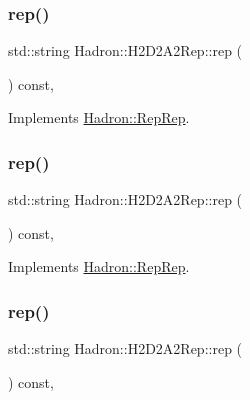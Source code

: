 \subsubsection{\texorpdfstring{rep()}{rep()}\hspace{0.1cm}{\footnotesize\ttfamily [2/5]}}
{\footnotesize\ttfamily std\+::string Hadron\+::\+H2\+D2\+A2\+Rep\+::rep (\begin{DoxyParamCaption}{ }\end{DoxyParamCaption}) const\hspace{0.3cm}{\ttfamily [inline]}, {\ttfamily [virtual]}}



Implements \mbox{\hyperlink{structHadron_1_1RepRep_ab3213025f6de249f7095892109575fde}{Hadron\+::\+Rep\+Rep}}.

\mbox{\label{structHadron_1_1H2D2A2Rep_a41083c39082d6fee296da79892e8b053}} 
\subsubsection{\texorpdfstring{rep()}{rep()}\hspace{0.1cm}{\footnotesize\ttfamily [3/5]}}
{\footnotesize\ttfamily std\+::string Hadron\+::\+H2\+D2\+A2\+Rep\+::rep (\begin{DoxyParamCaption}{ }\end{DoxyParamCaption}) const\hspace{0.3cm}{\ttfamily [inline]}, {\ttfamily [virtual]}}



Implements \mbox{\hyperlink{structHadron_1_1RepRep_ab3213025f6de249f7095892109575fde}{Hadron\+::\+Rep\+Rep}}.

\mbox{\label{structHadron_1_1H2D2A2Rep_a41083c39082d6fee296da79892e8b053}} 
\subsubsection{\texorpdfstring{rep()}{rep()}\hspace{0.1cm}{\footnotesize\ttfamily [4/5]}}
{\footnotesize\ttfamily std\+::string Hadron\+::\+H2\+D2\+A2\+Rep\+::rep (\begin{DoxyParamCaption}{ }\end{DoxyParamCaption}) const\hspace{0.3cm}{\ttfamily [inline]}, {\ttfamily [virtual]}}



